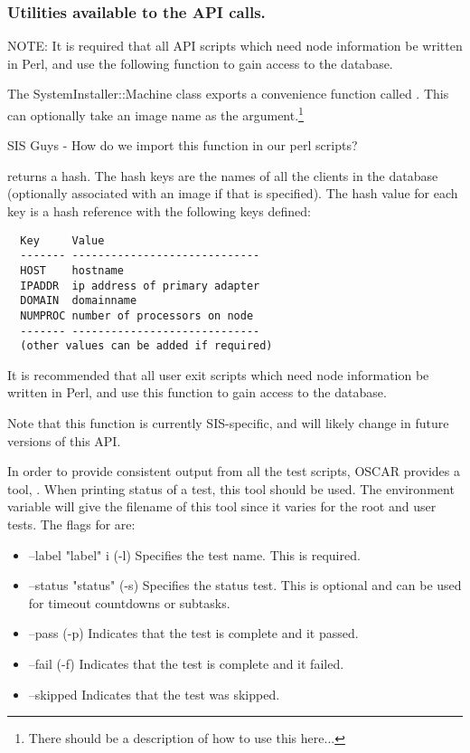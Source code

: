 \subsubsection{Utilities available to the API calls.}
\label{sec:api-utils}

NOTE: It is required that all API scripts which need node information be
written in Perl, and use the following function to gain access to the
database.

The SystemInstaller::Machine class exports a convenience function
called .  This can optionally take an image
name as the argument.\footnote{There should be a description of how to
  use this here...}

\begin{discuss}
SIS Guys - How do we import this function in our perl scripts?
\end{discuss}

 returns a hash.  The hash keys are the
names of all the clients in the database (optionally associated with
an image if that is specified).  The hash value for each key is a hash
reference with the following keys defined:

\begin{verbatim}
  Key     Value
  ------- -----------------------------
  HOST    hostname
  IPADDR  ip address of primary adapter
  DOMAIN  domainname
  NUMPROC number of processors on node
  ------- -----------------------------
  (other values can be added if required)
\end{verbatim}

It is recommended that all user exit scripts which need node
information be written in Perl, and use this function to gain access
to the database.

Note that this function is currently SIS-specific, and will likely
change in future versions of this API.


In order to provide consistent output from all the test scripts, OSCAR
provides a tool, . When printing status of a test, this tool
should be used. The environment variable  will
give the filename of this tool since it varies for the root and user 
tests. The flags for  are:
\begin{itemize}
\item --label "label" i (-l)  Specifies the test name. This is required.
\item --status "status" (-s)  Specifies the status test. This is optional and
                              can be used for timeout countdowns or subtasks.
\item --pass            (-p)  Indicates that the test is complete and it passed.
\item --fail            (-f)  Indicates that the test is complete and it failed.
\item --skipped               Indicates that the test was skipped.
\end{itemize}


